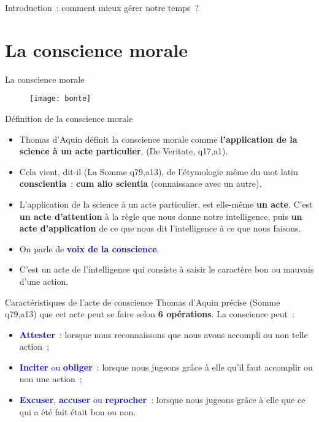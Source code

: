 \documentclass[11pt,xcolor=dvipsname,ignorenonframetext,handout]{beamer}
\begin{document}
\begin{frame}{Introduction~: comment mieux gérer notre temps~?}
\section{La conscience morale}
\begin{frame}{La conscience morale}
    {
        \begin{figure}
          \centering
          \texttt{[image: bonte]}
        \end{figure}
          }    
\end{frame}
\begin{frame}{Définition de la conscience morale}
    \begin{itemize}
        \rightskip=0pt\leftskip=0pt
        \item Thomas d'Aquin définit la conscience morale comme \textbf{l'application de la science à un acte particulier}, (De Veritate, q17,a1).
        \item Cela vient, dit-il (La Somme q79,a13), de l'étymologie même du mot latin \textbf{conscientia}~: \textbf{cum alio scientia} (connaissance avec un autre).
        \item L'application de la science à un acte particulier, est elle-même \textbf{un acte}. C'est \textbf{un acte d'attention} à la règle que nous donne notre intelligence, puis \textbf{un acte d'application} de ce que nous dit l'intelligence à ce que nous faisons.
        \item On parle de \textcolor{blue}{\textbf{voix de la conscience}}.
        \item C'est un acte de l'intelligence qui consiste à saisir le caractère bon ou mauvais d'une action.
    \end{itemize}
\end{frame}
\begin{frame}{Caractéristiques de l'acte de conscience}
    Thomas d'Aquin précise (Somme q79,a13) que cet acte peut se faire selon \textbf{6 opérations}. La conscience peut~:
    \begin{itemize}
        \rightskip=0pt\leftskip=0pt
        \item \textcolor{blue}{\textbf{Attester}}~: lorsque nous reconnaissons que nous avons accompli ou non telle action~;
        \item \textcolor{blue}{\textbf{Inciter} ou \textbf{obliger}}~: lorsque nous jugeons grâce à elle qu'il faut accomplir ou non une action~;
        \item \textcolor{blue}{\textbf{Excuser}, \textbf{accuser} ou \textbf{reprocher}}~: lorsque nous jugeons grâce à elle que ce qui a été fait était bon ou non.

\end{itemize}
\end{frame}
\end{frame}
\end{document}
